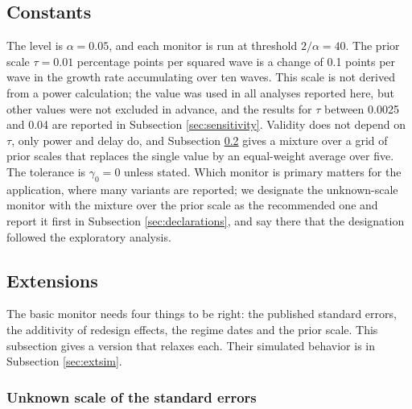\documentclass[Afour,sageh,times]{sagej}
\theoremstyle{definition}
\begin{document}
\subsection{Constants}
\label{sec:constants}

The level is $\alpha = 0.05$, and each monitor is run at threshold $2/\alpha = 40$. The prior scale $\tau = 0.01$ percentage points per squared wave is a change of 0.1 points per wave in the growth rate accumulating over ten waves. This scale is not derived from a power calculation; the value was used in all analyses reported here, but other values were not excluded in advance, and the results for $\tau$ between 0.0025 and 0.04 are reported in Subsection \ref{sec:sensitivity}. Validity does not depend on $\tau$, only power and delay do, and Subsection \ref{sec:extensions} gives a mixture over a grid of prior scales that replaces the single value by an equal-weight average over five. The tolerance is $\gamma_0 = 0$ unless stated. Which monitor is primary matters for the application, where many variants are reported; we designate the unknown-scale monitor with the mixture over the prior scale as the recommended one and report it first in Subsection \ref{sec:declarations}, and say there that the designation followed the exploratory analysis.

\subsection{Extensions}
\label{sec:extensions}

The basic monitor needs four things to be right: the published standard errors, the additivity of redesign effects, the regime dates and the prior scale. This subsection gives a version that relaxes each. Their simulated behavior is in Subsection \ref{sec:extsim}.

\subsubsection{Unknown scale of the standard errors}
\end{document}
